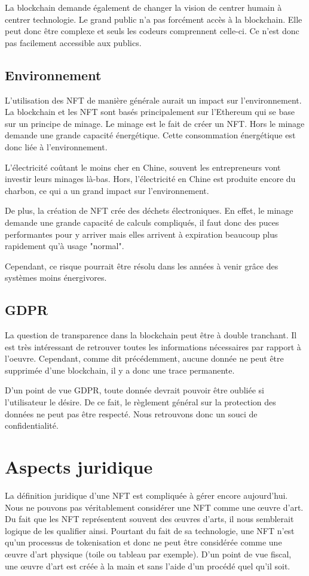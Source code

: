 \documentclass[11pt]{article}
\begin{document}
La blockchain demande également de changer la vision de centrer humain à centrer technologie. Le grand public n'a pas forcément accès à la blockchain. Elle peut donc être complexe et seuls les codeurs comprennent celle-ci. Ce n'est donc pas facilement accessible aux publics. 
\subsection{Environnement} %
L'utilisation des NFT de manière générale aurait un impact sur l'environnement. La blockchain et les NFT sont basés principalement sur l'Ethereum qui se base sur un principe de minage. Le minage est le fait de créer un NFT. Hors le minage demande une grande capacité énergétique. Cette consommation énergétique est donc liée à l'environnement. 

L'électricité coûtant le moins cher en Chine, souvent les entrepreneurs vont investir leurs minages là-bas. Hors, l'électricité en Chine est produite encore du charbon, ce qui a un grand impact sur l'environnement. \cite{abdou_prospects_2021} 

De plus, la création de NFT crée des déchets électroniques. En effet, le minage demande une grande capacité de calculs compliqués, il faut donc des puces performantes pour y arriver mais elles arrivent à expiration beaucoup plus rapidement qu'à usage "normal".

Cependant, ce risque pourrait être résolu dans les années à venir grâce des systèmes moins énergivores. 

\subsection{GDPR} %
La question de transparence dans la blockchain peut être à double tranchant. Il est très intéressant de retrouver toutes les informations nécessaires par rapport à l'oeuvre. Cependant, comme dit précédemment, aucune donnée ne peut être supprimée d'une blockchain, il y a donc une trace permanente. 

D'un point de vue GDPR, toute donnée devrait pouvoir être oubliée si l'utilisateur le désire. De ce fait, le règlement général sur la protection des données ne peut pas être respecté. Nous retrouvons donc un souci de confidentialité.
\section{Aspects juridique} %
La définition juridique d'une NFT est compliquée à gérer encore aujourd'hui. Nous ne pouvons pas véritablement considérer une NFT comme une œuvre d'art.  Du fait que les NFT représentent souvent des œuvres d'arts, il nous semblerait logique de les qualifier ainsi. Pourtant du fait de sa technologie, une NFT n'est qu'un processus de tokenisation et donc ne peut être considérée comme une œuvre d'art physique (toile ou tableau par exemple). D'un point de vue fiscal, une œuvre d'art est créée à la main et sans l'aide d'un procédé quel qu'il soit. 
\end{document}
